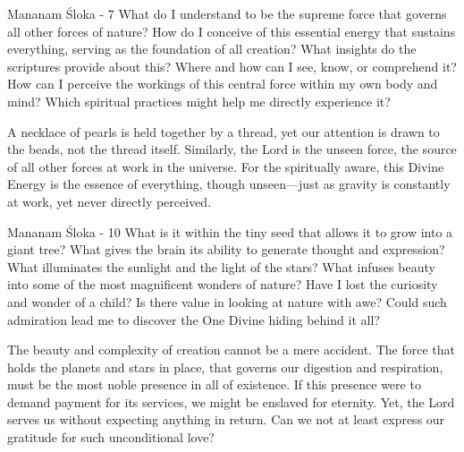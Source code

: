 
\newpage
\begin{mananam}{\mananamfont Mananam Śloka - 7}
\normalfont\mananamtext What do I understand to be the supreme force that governs all other forces of nature? How do I conceive of this essential energy that sustains everything, serving as the foundation of all creation? What insights do the scriptures provide about this? Where and how can I see, know, or comprehend it? How can I perceive the workings of this central force within my own body and mind? Which spiritual practices might help me directly experience it?
\end{mananam}
\sreflect
\begin{inspiration}{}
\normalfont\mananamtext A necklace of pearls is held together by a thread, yet our attention is drawn to the beads, not the thread itself. Similarly, the Lord is the unseen force, the source of all other forces at work in the universe. For the spiritually aware, this Divine Energy is the essence of everything, though unseen—just as gravity is constantly at work, yet never directly perceived.
\end{inspiration}
\newpage
\begin{mananam}{\mananamfont Mananam Śloka - 10}
\normalfont\mananamtext
What is it within the tiny seed that allows it to grow into a giant tree? What gives the brain its ability to generate thought and expression? What illuminates the sunlight and the light of the stars? What infuses beauty into some of the most magnificent wonders of nature? Have I lost the curiosity and wonder of a child? Is there value in looking at nature with awe? Could such admiration lead me to discover the One Divine hiding behind it all?
\end{mananam}
\sreflect
\begin{inspiration}{}
\normalfont\mananamtext The beauty and complexity of creation cannot be a mere accident. The force that holds the planets and stars in place, that governs our digestion and respiration, must be the most noble presence in all of existence. If this presence were to demand payment for its services, we might be enslaved for eternity. Yet, the Lord serves us without expecting anything in return. Can we not at least express our gratitude for such unconditional love?
\end{inspiration}
\newpage

